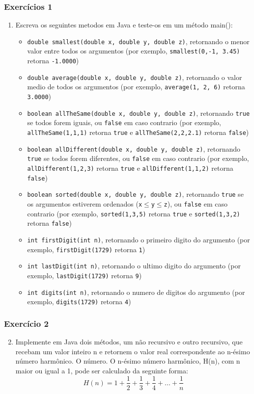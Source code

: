 \documentclass[xcolor={dvipsnames,table},aspectratio=169]{beamer}
\begin{document}
\begin{frame}[fragile]\frametitle{Exercícios 1}
\begin{enumerate}
	\item Escreva os seguintes metodos em Java e teste-os em um método main():
	\begin{itemize}
		\scriptsize
		\item \texttt{double smallest(double x, double y, double z)}, retornando o menor valor entre todos os argumentos (por exemplo, \texttt{smallest(0,-1, 3.45)} retorna \texttt{-1.0000})
		\item \texttt{double average(double x, double y, double z)}, retornando o valor medio de todos os argumentos (por exemplo, \texttt{average(1, 2, 6)} retorna \texttt{3.0000})
		\item \texttt{boolean allTheSame(double x, double y, double z)}, retornando \texttt{true} se todos forem iguais, ou \texttt{false} em caso contrario (por exemplo, \texttt{allTheSame(1,1,1)} retorna \texttt{true} e \texttt{allTheSame(2,2,2.1)} retorna \texttt{false})
		\item \texttt{boolean allDifferent(double x, double y, double z)}, retornando \texttt{true} se todos forem diferentes, ou \texttt{false} em caso contrario (por exemplo, \texttt{allDifferent(1,2,3)} retorna \texttt{true} e \texttt{allDifferent(1,1,2)} retorna \texttt{false})
		\item \texttt{boolean sorted(double x, double y, double z)}, retornando \texttt{true} se os argumentos estiverem ordenados (\texttt{x}$\leqslant$\texttt{y}$\leqslant$\texttt{z}), ou \texttt{false} em caso contrario (por exemplo, \texttt{sorted(1,3,5)} retorna \texttt{true} e \texttt{sorted(1,3,2)} retorna \texttt{false})
		\item \texttt{int firstDigit(int n)}, retornando o primeiro digito do argumento (por exemplo, \texttt{firstDigit(1729)} retorna \texttt{1})
		\item \texttt{int lastDigit(int n)}, retornando o ultimo digito do argumento (por exemplo, \texttt{lastDigit(1729)} retorna \texttt{9})
		\item \texttt{int digits(int n)}, retornando o numero de digitos do argumento (por exemplo, \texttt{digits(1729)} retorna \texttt{4})
	\end{itemize}
\end{enumerate}
\end{frame}

\begin{frame}[fragile]\frametitle{Exercício 2}
\begin{enumerate}
        \setcounter{enumi}{1}
	\item Implemente em Java dois métodos, um não recursivo e outro recursivo, que recebam um valor inteiro n e retornem o valor real correspondente ao n-ésimo número harmônico.
O número. O n-ésimo número harmônico, H(n), com n maior ou igual a 1, pode ser calculado da seguinte forma:
\[ H(n) = 1 + \frac{1}{2} + \frac{1}{3} +\frac{1}{4} + ... + \frac{1}{n}\]
\end{enumerate}
\end{frame}
\end{document}
